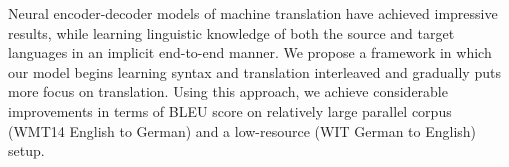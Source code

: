 Neural encoder-decoder models of machine translation have achieved impressive results, while learning linguistic knowledge of both the source and target languages in an implicit end-to-end manner. We propose a framework in which our model begins learning syntax and translation interleaved and gradually puts more focus on translation. Using this approach, we achieve considerable improvements in terms of BLEU score on relatively large parallel corpus (WMT14 English to German) and a low-resource (WIT German to English) setup.